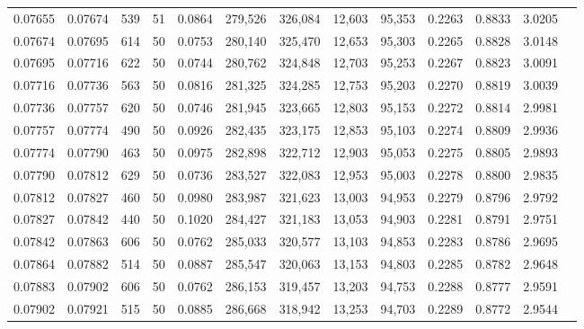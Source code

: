 \begin{tabular}{rrrrrrrrrrrrr}
0.07655 & 0.07674 &   539 &  51 &                                     0.0864 & 279,526 & 326,084 &  12,603 &  95,353 & 0.2263 & 0.8833 & 3.0205 \\
0.07674 & 0.07695 &   614 &  50 &                                     0.0753 & 280,140 & 325,470 &  12,653 &  95,303 & 0.2265 & 0.8828 & 3.0148 \\
0.07695 & 0.07716 &   622 &  50 &                                     0.0744 & 280,762 & 324,848 &  12,703 &  95,253 & 0.2267 & 0.8823 & 3.0091 \\
0.07716 & 0.07736 &   563 &  50 &                                     0.0816 & 281,325 & 324,285 &  12,753 &  95,203 & 0.2270 & 0.8819 & 3.0039 \\
0.07736 & 0.07757 &   620 &  50 &                                     0.0746 & 281,945 & 323,665 &  12,803 &  95,153 & 0.2272 & 0.8814 & 2.9981 \\
0.07757 & 0.07774 &   490 &  50 &                                     0.0926 & 282,435 & 323,175 &  12,853 &  95,103 & 0.2274 & 0.8809 & 2.9936 \\
0.07774 & 0.07790 &   463 &  50 &                                     0.0975 & 282,898 & 322,712 &  12,903 &  95,053 & 0.2275 & 0.8805 & 2.9893 \\
0.07790 & 0.07812 &   629 &  50 &                                     0.0736 & 283,527 & 322,083 &  12,953 &  95,003 & 0.2278 & 0.8800 & 2.9835 \\
0.07812 & 0.07827 &   460 &  50 &                                     0.0980 & 283,987 & 321,623 &  13,003 &  94,953 & 0.2279 & 0.8796 & 2.9792 \\
0.07827 & 0.07842 &   440 &  50 &                                     0.1020 & 284,427 & 321,183 &  13,053 &  94,903 & 0.2281 & 0.8791 & 2.9751 \\
0.07842 & 0.07863 &   606 &  50 &                                     0.0762 & 285,033 & 320,577 &  13,103 &  94,853 & 0.2283 & 0.8786 & 2.9695 \\
0.07864 & 0.07882 &   514 &  50 &                                     0.0887 & 285,547 & 320,063 &  13,153 &  94,803 & 0.2285 & 0.8782 & 2.9648 \\
0.07883 & 0.07902 &   606 &  50 &                                     0.0762 & 286,153 & 319,457 &  13,203 &  94,753 & 0.2288 & 0.8777 & 2.9591 \\
0.07902 & 0.07921 &   515 &  50 &                                     0.0885 & 286,668 & 318,942 &  13,253 &  94,703 & 0.2289 & 0.8772 & 2.9544 \\

\end{tabular}
